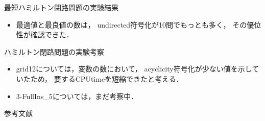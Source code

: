 \documentclass[dvipdfmx,10pt]{beamer}
\begin{document}
\begin{frame}[noframenumbering]{最短ハミルトン閉路問題の実験結果}

\begin{itemize}
\item 最適値と最良値の数は，
\textsf{undirected}符号化が10問でもっとも多く，
その優位性が確認できた．
\end{itemize}
    
\end{frame}

\begin{frame}[noframenumbering]{ハミルトン閉路問題の実験考察}


\begin{itemize}
\item \textsf{grid12}については，変数の数において，
  \textsf{acyclicity}符号化が少ない値を示していたため，
  要するCPUtimeを短縮できたと考える．
\item \textsf{3-FullIns\_5}については，まだ考察中．
\end{itemize}
\end{frame}

\begin{frame}[noframenumbering]{参考文献}
\end{frame}
\end{document}
